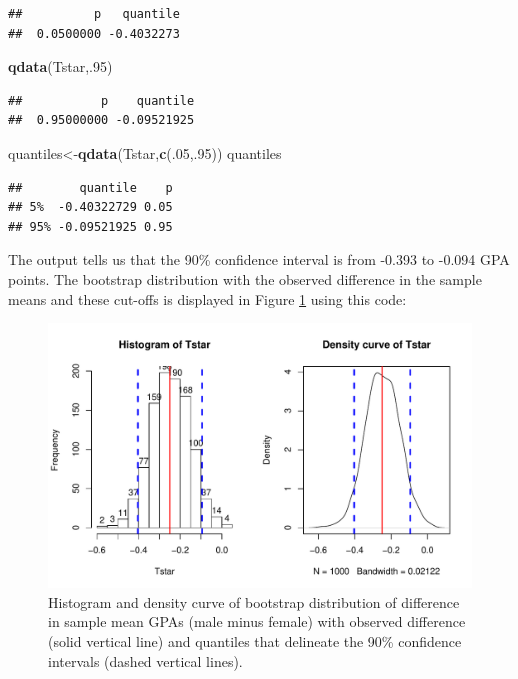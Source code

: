 \documentclass[]{book}
\newenvironment{Shaded}{\begin{snugshade}}{\end{snugshade}}
\newcommand{\KeywordTok}[1]{\textcolor[rgb]{0.13,0.29,0.53}{\textbf{#1}}}
\newcommand{\DecValTok}[1]{\textcolor[rgb]{0.00,0.00,0.81}{#1}}
\newcommand{\NormalTok}[1]{#1}
\theoremstyle{definition}
\theoremstyle{definition}
\theoremstyle{remark}
\begin{document}
\begin{verbatim}
##          p   quantile 
##  0.0500000 -0.4032273
\end{verbatim}

\begin{Shaded}
\begin{Highlighting}[]
\KeywordTok{qdata}\NormalTok{(Tstar,.}\DecValTok{95}\NormalTok{)}
\end{Highlighting}
\end{Shaded}

\begin{verbatim}
##           p    quantile 
##  0.95000000 -0.09521925
\end{verbatim}

\begin{Shaded}
\begin{Highlighting}[]
\NormalTok{quantiles<-}\KeywordTok{qdata}\NormalTok{(Tstar,}\KeywordTok{c}\NormalTok{(.}\DecValTok{05}\NormalTok{,.}\DecValTok{95}\NormalTok{))}
\NormalTok{quantiles}
\end{Highlighting}
\end{Shaded}

\begin{verbatim}
##        quantile    p
## 5%  -0.40322729 0.05
## 95% -0.09521925 0.95
\end{verbatim}

The output tells us that the 90\% confidence interval is from -0.393 to
-0.094 GPA points. The bootstrap distribution with the observed
difference in the sample means and these cut-offs is displayed in Figure
\ref{fig:Figure2-21} using this code:






\begin{figure}
\centering
\includegraphics{02-reintroductionToStatistics_files/figure-latex/Figure2-21-1.pdf}
\caption{\label{fig:Figure2-21}Histogram and density curve of bootstrap distribution of
difference in sample mean GPAs (male minus female) with observed
difference (solid vertical line) and quantiles that delineate the 90\%
confidence intervals (dashed vertical lines).}
\end{figure}
\end{document}
